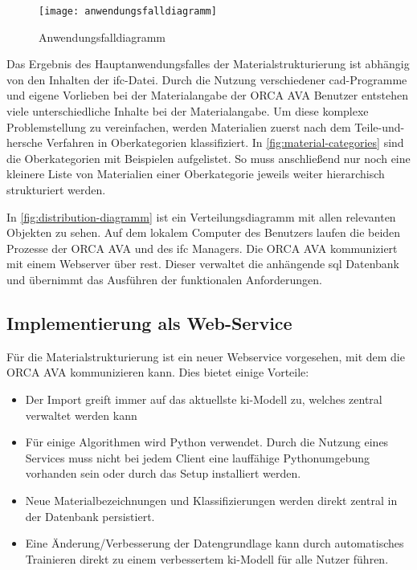 \begin{figure}[h]
	\centering
	\texttt{[image: anwendungsfalldiagramm]}
	\caption{Anwendungsfalldiagramm}
	\label{fig:usecasediagramm}
\end{figure}

Das Ergebnis des Hauptanwendungsfalles der Materialstrukturierung ist abhängig von den Inhalten der \ac{ifc}-Datei. Durch die Nutzung verschiedener \ac{cad}-Programme und eigene Vorlieben bei der Materialangabe der ORCA AVA Benutzer entstehen viele unterschiedliche Inhalte bei der Materialangabe. Um diese komplexe Problemstellung zu vereinfachen, werden Materialien zuerst nach dem \glqq Teile-und-hersche\grqq{} Verfahren in Oberkategorien klassifiziert. In \autoref{fig:material-categories} sind die Oberkategorien mit Beispielen aufgelistet. So muss anschließend nur noch eine kleinere Liste von Materialien einer Oberkategorie jeweils weiter hierarchisch strukturiert werden.

In \autoref{fig:distribution-diagramm} ist ein Verteilungsdiagramm mit allen relevanten Objekten zu sehen. Auf dem lokalem Computer des Benutzers laufen die beiden Prozesse der ORCA AVA und des \ac{ifc} Managers. Die ORCA AVA kommuniziert mit einem Webserver über \ac{rest}. Dieser verwaltet die anhängende \ac{sql} Datenbank und übernimmt das Ausführen der funktionalen Anforderungen.

\subsection{Implementierung als Web-Service}
\label{c:conception:architecture:service}
Für die Materialstrukturierung ist ein neuer Webservice vorgesehen, mit dem die ORCA AVA kommunizieren kann. Dies bietet einige Vorteile:

\begin{itemize}
	\setlength\itemsep{0.3em}
	\item Der Import greift immer auf das aktuellste \ac{ki}-Modell zu, welches zentral verwaltet werden kann
	\item Für einige Algorithmen wird Python verwendet. Durch die Nutzung eines Services muss nicht bei jedem Client eine lauffähige Pythonumgebung vorhanden sein oder durch das Setup installiert werden.
	\item Neue Materialbezeichnungen und Klassifizierungen werden direkt zentral in der Datenbank persistiert.
	\item Eine Änderung/Verbesserung der Datengrundlage kann durch automatisches Trainieren direkt zu einem verbessertem \ac{ki}-Modell für alle Nutzer führen.
\end{itemize}

